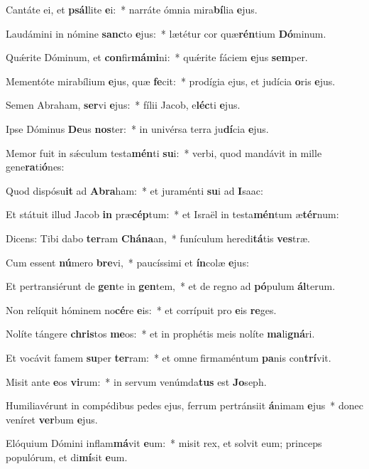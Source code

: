 \item Cantáte ei, et \textbf{psál}lite \textbf{e}i:~* narráte ómnia mira\textbf{bí}lia \textbf{e}jus.
\item Laudámini in nómine \textbf{sanc}to \textbf{e}jus:~* lætétur cor quæ\textbf{rén}tium \textbf{Dó}minum.
\item Quǽrite Dóminum, et \textbf{con}fir\textbf{má}\textbf{mi}ni:~* quǽrite fáciem \textbf{e}jus \textbf{sem}per.
\item Mementóte mirabílium \textbf{e}jus, quæ \textbf{fe}cit:~* prodígia ejus, et judícia \textbf{o}ris \textbf{e}jus.
\item Semen Abraham, \textbf{ser}vi \textbf{e}jus:~* fílii Jacob, e\textbf{léc}ti \textbf{e}jus.
\item Ipse Dóminus \textbf{De}us \textbf{nos}ter:~* in univérsa terra ju\textbf{dí}cia \textbf{e}jus.
\item Memor fuit in sǽculum testa\textbf{mén}ti \textbf{su}i:~* verbi, quod mandávit in mille gene\textbf{ra}ti\textbf{ó}nes:
\item Quod dispósu\textbf{it} ad \textbf{A}\textbf{bra}ham:~* et juraménti \textbf{su}i ad \textbf{I}saac:
\item Et státuit illud Jacob \textbf{in} præ\textbf{cép}tum:~* et Israël in testa\textbf{mén}tum æ\textbf{tér}num:
\item Dicens: Tibi dabo \textbf{ter}ram \textbf{Chá}\textbf{na}an,~* funículum heredi\textbf{tá}tis \textbf{ves}træ.
\item Cum essent \textbf{nú}mero \textbf{bre}vi,~* paucíssimi et \textbf{ín}colæ \textbf{e}jus:
\item Et pertransiérunt de \textbf{gen}te in \textbf{gen}tem,~* et de regno ad \textbf{pó}pulum \textbf{ál}terum.
\item Non relíquit hóminem no\textbf{cé}re \textbf{e}is:~* et corrípuit pro \textbf{e}is \textbf{re}ges.
\item Nolíte tángere \textbf{chris}tos \textbf{me}os:~* et in prophétis meis nolíte \textbf{ma}li\textbf{gná}ri.
\item Et vocávit famem \textbf{su}per \textbf{ter}ram:~* et omne firmaméntum \textbf{pa}nis con\textbf{trí}vit.
\item Misit ante \textbf{e}os \textbf{vi}rum:~* in servum venúmda\textbf{tus} est \textbf{Jo}seph.
\item Humiliavérunt in compédibus pedes ejus, ferrum pertránsiit \textbf{á}nimam \textbf{e}jus~* donec veníret \textbf{ver}bum \textbf{e}jus.
\item Elóquium Dómini inflam\textbf{má}vit \textbf{e}um:~* misit rex, et solvit eum; princeps populórum, et di\textbf{mí}sit \textbf{e}um.
